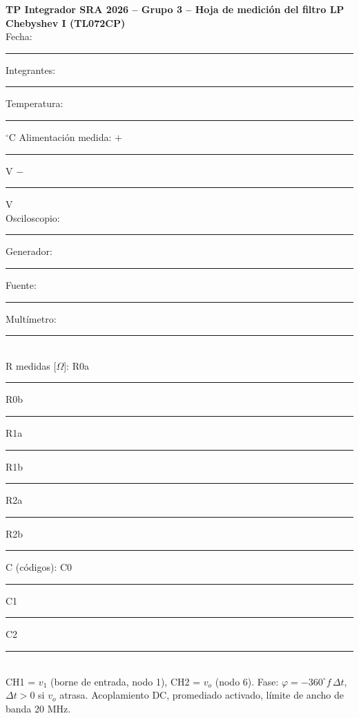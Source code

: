 \documentclass[10pt,a4paper]{article}
\begin{document}
\noindent\textbf{TP Integrador SRA 2026 -- Grupo 3 -- Hoja de medici\'on del filtro LP Chebyshev I (TL072CP)}\\[2pt]
Fecha: \rule{3cm}{0.4pt} \quad Integrantes: \rule{7cm}{0.4pt} \quad Temperatura: \rule{1.5cm}{0.4pt} $^\circ$C
\quad Alimentaci\'on medida: $+$\rule{1.2cm}{0.4pt} V \; $-$\rule{1.2cm}{0.4pt} V\\[2pt]
Osciloscopio: \rule{4cm}{0.4pt} \quad Generador: \rule{4cm}{0.4pt} \quad Fuente: \rule{3.5cm}{0.4pt} \quad Mult\'imetro: \rule{3.5cm}{0.4pt}\\[2pt]
R medidas [$\Omega$]: R0a \rule{1.4cm}{0.4pt} R0b \rule{1.4cm}{0.4pt} R1a \rule{1.4cm}{0.4pt} R1b \rule{1.4cm}{0.4pt}
R2a \rule{1.4cm}{0.4pt} R2b \rule{1.4cm}{0.4pt} \quad C (c\'odigos): C0 \rule{1.2cm}{0.4pt} C1 \rule{1.2cm}{0.4pt} C2 \rule{1.2cm}{0.4pt}\\[2pt]
\small CH1 = $v_1$ (borne de entrada, nodo 1), CH2 = $v_o$ (nodo 6). Fase: $\varphi = -360^\circ f\,\Delta t$, $\Delta t>0$ si $v_o$ atrasa. Acoplamiento DC,
promediado activado, l\'imite de ancho de banda 20 MHz.\\[4pt]
\renewcommand{\arraystretch}{1.25}
\end{document}
